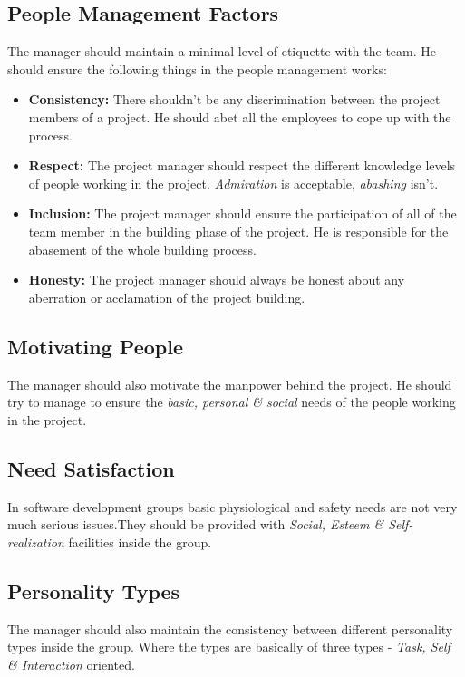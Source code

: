 \documentclass[dvips,12pt]{article}
\begin{document}
\subsection{People Management Factors}
The manager should maintain a minimal level of etiquette with the team. He should ensure the following things in the people management works:
 \begin{itemize}
\item \textbf{Consistency:} There shouldn't be any discrimination between the project members of a project. He should abet all the employees to cope up with the process.
\item \textbf{Respect:} The project manager should respect the different knowledge levels of people working in the project. \emph{Admiration} is acceptable, \emph{abashing} isn't.
\item \textbf{Inclusion:} The project manager should ensure the participation of all of the team member in the building phase of the project. He is responsible for the abasement of the whole building process.
\item \textbf{Honesty:} The project manager should always be honest about any aberration or acclamation of the project building.
\end{itemize}

\subsection{Motivating People}
The manager should also motivate the manpower behind the project. He should try to manage to ensure the \emph{basic, personal \& social} needs of the people working in the project.

\subsection{Need Satisfaction}
In software development groups basic physiological and safety needs are not very much serious issues.They should be provided with \emph{Social, Esteem \& Self-realization} facilities inside the group.

\subsection{Personality Types} \label{ptype}
The manager should also maintain the consistency between different personality types inside the group. Where the types are basically of three types - \emph{Task, Self \& Interaction} oriented.
\end{document}
